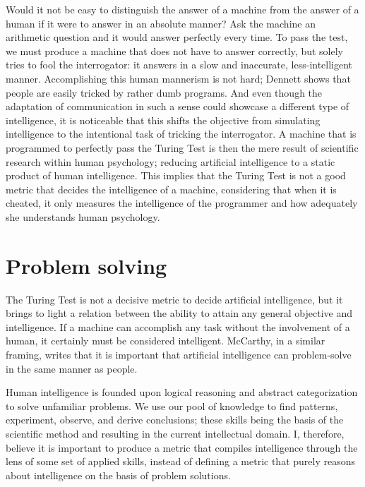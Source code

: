 \documentclass[10pt]{diazessay} %
\begin{document}
Would it not be easy to distinguish the answer of a machine from the answer of a human if it were to answer in an absolute manner? Ask the machine an arithmetic question and it would answer perfectly every time. To pass the test, we must produce a machine that does not have to answer correctly, but solely tries to fool the interrogator: it answers in a slow and inaccurate, less-intelligent manner. Accomplishing this human mannerism is not hard; Dennett shows that people are easily tricked by rather dumb programs\cite{dennett}. And even though the adaptation of communication in such a sense could showcase a different type of intelligence, it is noticeable that this shifts the objective from simulating intelligence to the intentional task of tricking the interrogator. A machine that is programmed to perfectly pass the Turing Test is then the mere result of scientific research within human psychology; reducing artificial intelligence to a static product of human intelligence. This implies that the Turing Test is not a good metric that decides the intelligence of a machine, considering that when it is cheated, it only measures the intelligence of the programmer and how adequately she understands human psychology.


\section*{Problem solving}
The Turing Test is not a decisive metric to decide artificial intelligence, but it brings to light a relation between the ability to attain any general objective and intelligence. If a machine can accomplish any task without the involvement of a human, it certainly must be considered intelligent. McCarthy, in a similar framing, writes that it is important that artificial intelligence can problem-solve in the same manner as people\cite{mcarthy}.


Human intelligence is founded upon logical reasoning and abstract categorization to solve unfamiliar problems. We use our pool of knowledge to find patterns, experiment, observe, and derive conclusions; these skills being the basis of the scientific method and resulting in the current intellectual domain. I, therefore, believe it is important to produce a metric that compiles intelligence through the lens of some set of applied skills, instead of defining a metric that purely reasons about intelligence on the basis of problem solutions.
\end{document}
